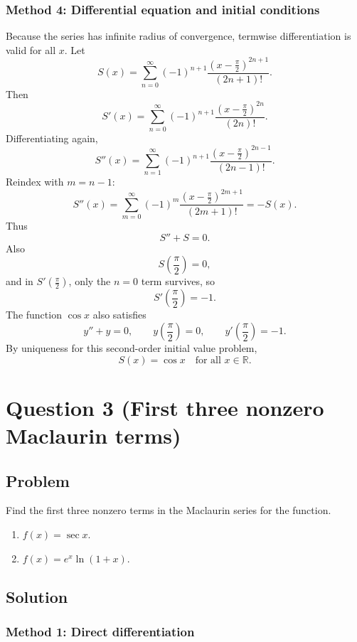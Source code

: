\documentclass[12pt]{article}
\newcommand{\R}{\mathbb{R}}
\begin{document}
\newpage
\subsubsection{Method 4: Differential equation and initial conditions}

Because the series has infinite radius of convergence, termwise differentiation is valid
for all \(x\). Let
\[
S(x)=
\sum_{n=0}^{\infty}(-1)^{n+1}
\frac{\left(x-\frac{\pi}{2}\right)^{2n+1}}{(2n+1)!}.
\]
Then
\[
S'(x)=
\sum_{n=0}^{\infty}(-1)^{n+1}
\frac{\left(x-\frac{\pi}{2}\right)^{2n}}{(2n)!}.
\]
Differentiating again,
\[
S''(x)=
\sum_{n=1}^{\infty}(-1)^{n+1}
\frac{\left(x-\frac{\pi}{2}\right)^{2n-1}}{(2n-1)!}.
\]
Reindex with \(m=n-1\):
\[
S''(x)=
\sum_{m=0}^{\infty}(-1)^m
\frac{\left(x-\frac{\pi}{2}\right)^{2m+1}}{(2m+1)!}
=-S(x).
\]
Thus
\[
S''+S=0.
\]
Also
\[
S\left(\frac{\pi}{2}\right)=0,
\]
and in \(S'\left(\frac{\pi}{2}\right)\), only the \(n=0\) term survives, so
\[
S'\left(\frac{\pi}{2}\right)=-1.
\]
The function \(\cos x\) also satisfies
\[
y''+y=0,\qquad
y\left(\frac{\pi}{2}\right)=0,\qquad
y'\left(\frac{\pi}{2}\right)=-1.
\]
By uniqueness for this second-order initial value problem,
\[
\boxed{S(x)=\cos x\quad\text{for all }x\in\R.}
\]


\newpage
\section{Question 3 (First three nonzero Maclaurin terms)}

\subsection{Problem}
Find the first three nonzero terms in the Maclaurin series for the function.

\begin{enumerate}[label=(\alph*)]
  \item \(f(x)=\sec x.\)
  \item \(f(x)=e^x\ln(1+x).\)
\end{enumerate}


\bigskip
\subsection{Solution}

\subsubsection{Method 1: Direct differentiation}
\end{document}
